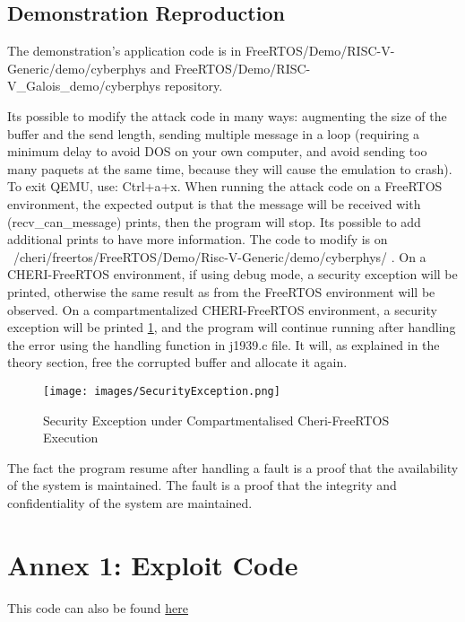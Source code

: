 \documentclass[a4paper, 11pt]{article}
\begin{document}
\subsection{Demonstration Reproduction}
The demonstration's application code is in FreeRTOS/Demo/RISC-V-Generic/demo/cyberphys and FreeRTOS/Demo/RISC-V\_Galois\_demo/cyberphys repository.


Its possible to modify the attack code in many ways: augmenting the size of the buffer and the send length, sending multiple message in a loop (requiring a minimum delay to avoid DOS on your own computer, and avoid sending too many paquets at the same time, because they will cause the emulation to crash).
To exit QEMU, use: Ctrl+a+x.
When running the attack code on a FreeRTOS environment, the expected output is that the message will be received with (recv\_can\_message) prints, then the program will stop. Its possible to add additional prints to have more information. The code to modify is on ~/cheri/freertos/FreeRTOS/Demo/Risc-V-Generic/demo/cyberphys/ .
On a CHERI-FreeRTOS environment, if using debug mode, a security exception will be printed, otherwise the same result as from the FreeRTOS environment will be observed.
On a compartmentalized CHERI-FreeRTOS environment, a security exception will be printed \ref{sec:cyberphys-error}, and the program will continue running after handling the error using the handling function in j1939.c file. It will, as explained in the theory section, free the corrupted buffer and allocate it again.
\begin{figure}[h!]
	\texttt{[image: images/SecurityException.png]}
	\caption{Security Exception under Compartmentalised Cheri-FreeRTOS Execution}
	\label{sec:cyberphys-error}
\end{figure}

The fact the program resume after handling a fault is a proof that the availability of the system is maintained. The fault is a proof that the integrity and confidentiality of the system are maintained.
\clearpage 



\clearpage 
\appendix
\section{Annex 1: Exploit Code}
This code can also be found \href{https://github.com/pglbgit2/exploit.git}{here}

\end{document}
